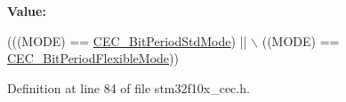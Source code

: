 {\bfseries Value\+:}
\begin{DoxyCode}
(((MODE) == \hyperlink{group___c_e_c___bit_period___mode_ga746ce0a831dfd76a47add310662c7f07}{CEC\_BitPeriodStdMode}) || \(\backslash\)
                                            ((MODE) == \hyperlink{group___c_e_c___bit_period___mode_ga5bf4c1b257b837770d4d59c93cca6902}{CEC\_BitPeriodFlexibleMode}))
\end{DoxyCode}


Definition at line 84 of file stm32f10x\+\_\+cec.\+h.

